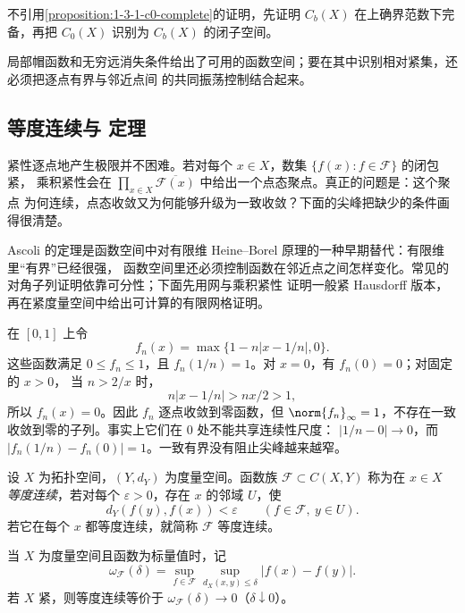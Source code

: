\begin{exercise}[$C_0(X)$ 的完备性]
不引用\cref{proposition:1-3-1-c0-complete}的证明，先证明 $C_b(X)$ 在上确界范数下完备，再把
$C_0(X)$ 识别为 $C_b(X)$ 的闭子空间。
\end{exercise}

局部帽函数和无穷远消失条件给出了可用的函数空间；要在其中识别相对紧集，还必须把逐点有界与邻近点间
的共同振荡控制结合起来。

\subsection{等度连续与 \ArzelaAscoli{} 定理}\label{subsec:1-3-2}

紧性逐点地产生极限并不困难。若对每个 $x\in X$，数集 $\{f(x):f\in\mathcal F\}$ 的闭包紧，
乘积紧性会在 $\prod_{x\in X}\overline{\mathcal F(x)}$ 中给出一个点态聚点。真正的问题是：这个聚点
为何连续，点态收敛又为何能够升级为一致收敛？下面的尖峰把缺少的条件画得很清楚。

Ascoli 的定理是函数空间中对有限维 Heine--Borel 原理的一种早期替代：有限维里“有界”已经很强，
函数空间里还必须控制函数在邻近点之间怎样变化。常见的对角子列证明依靠可分性；下面先用网与乘积紧性
证明一般紧 Hausdorff 版本，再在紧度量空间中给出可计算的有限网格证明。

\begin{example}[移动尖峰]\label{ex:1-3-2-2}
在 $[0,1]$ 上令
\[
  f_n(x)=\max\{1-n|x-1/n|,0\}.
\]
这些函数满足 $0\le f_n\le1$，且 $f_n(1/n)=1$。对 $x=0$，有 $f_n(0)=0$；对固定的 $x>0$，
当 $n>2/x$ 时，
\[
 n|x-1/n|>nx/2>1,
\]
所以 $f_n(x)=0$。因此 $f_n$ 逐点收敛到零函数，但
$\norm{f_n}_\infty=1$，不存在一致收敛到零的子列。事实上它们在 $0$ 处不能共享连续性尺度：
$|1/n-0|\to0$，而 $|f_n(1/n)-f_n(0)|=1$。一致有界没有阻止尖峰越来越窄。
\end{example}

\begin{definition}[等度连续]\label{def:1-3-2-1}
设 $X$ 为拓扑空间，$(Y,d_Y)$ 为度量空间。函数族
$\mathcal F\subset C(X,Y)$ 称为在 $x\in X$ \emph{等度连续}，若对每个
$\varepsilon>0$，存在 $x$ 的邻域 $U$，使
\[
 d_Y(f(y),f(x))<\varepsilon
 \qquad(f\in\mathcal F,\ y\in U).
\]
若它在每个 $x$ 都等度连续，就简称 $\mathcal F$ 等度连续。

当 $X$ 为度量空间且函数为标量值时，记
\[
 \omega_{\mathcal F}(\delta)
 =\sup_{f\in\mathcal F}\sup_{d_X(x,y)\le\delta}|f(x)-f(y)|.
\]
若 $X$ 紧，则等度连续等价于
$\omega_{\mathcal F}(\delta)\to0$（$\delta\downarrow0$）。
\end{definition}

